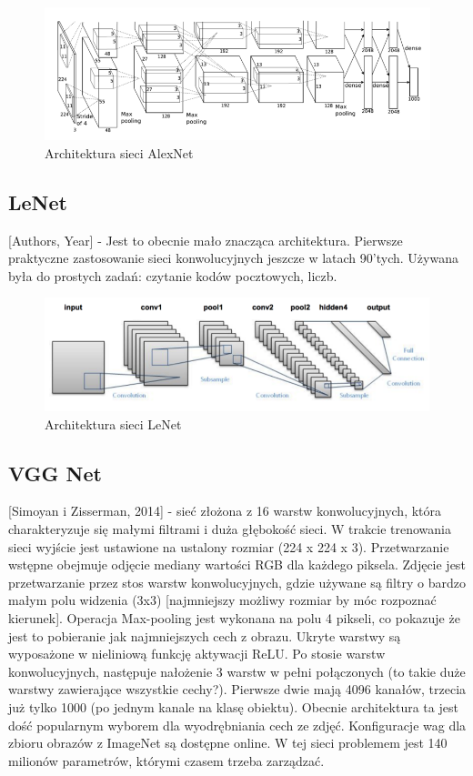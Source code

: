 \documentclass[12pt,a4paper,twoside,titlepage,openright]{book}
\begin{document}
\begin{figure}[h]
	\centering
			\includegraphics[resolution=120]{AlexNet.png}
		\caption{Architektura sieci AlexNet}
\end{figure}

\subsection{LeNet}
[Authors, Year] - Jest to obecnie mało znacząca architektura. Pierwsze praktyczne zastosowanie sieci konwolucyjnych jeszcze w latach 90’tych. Używana była do prostych zadań: czytanie kodów pocztowych, liczb.\cite{Lecun98gradient-basedlearning}

\begin{figure}[h]
	\centering
			\includegraphics[resolution=120]{LeNet.png}
		\caption{Architektura sieci LeNet}
\end{figure}

\subsection{VGG Net}
 [Simoyan i Zisserman, 2014] - sieć złożona z 16 warstw konwolucyjnych, która charakteryzuje się małymi filtrami i duża głębokość sieci.
W trakcie trenowania sieci wyjście jest ustawione na ustalony rozmiar (224 x 224 x 3). Przetwarzanie wstępne obejmuje odjęcie mediany wartości RGB dla każdego piksela. Zdjęcie jest przetwarzanie przez stos warstw konwolucyjnych, gdzie używane są filtry o bardzo małym polu widzenia (3x3) [najmniejszy możliwy rozmiar by móc rozpoznać kierunek]. Operacja Max-pooling jest wykonana na polu 4 pikseli, co pokazuje że jest to pobieranie jak najmniejszych cech z obrazu. Ukryte warstwy są wyposażone w nieliniową funkcję aktywacji ReLU. Po stosie warstw konwolucyjnych, następuje nałożenie 3 warstw w pełni połączonych (to takie duże warstwy zawierające wszystkie cechy?). Pierwsze dwie mają 4096 kanałów, trzecia już tylko 1000 (po jednym kanale na klasę obiektu). Obecnie architektura ta jest dość popularnym wyborem dla wyodrębniania cech ze zdjęć. Konfiguracje wag dla zbioru obrazów z ImageNet są dostępne online. W tej sieci problemem jest 140 milionów parametrów, którymi czasem trzeba zarządzać. \cite{DBLP:journals/corr/SimonyanZ14a}
\end{document}
